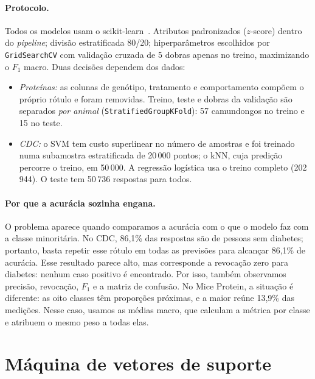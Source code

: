 \documentclass[aps,pre,twocolumn,10pt,nofootinbib]{revtex4-2}
\begin{document}
\paragraph{Protocolo.}
Todos os modelos usam o scikit-learn~\cite{sklearn}.
Atributos padronizados ($z$-score) dentro do \textit{pipeline}; divisão
estratificada 80/20; hiperparâmetros escolhidos por \texttt{GridSearchCV}
com validação cruzada de 5 dobras apenas no treino, maximizando o $F_1$
macro. Duas decisões dependem dos dados:
\begin{itemize}
\item \emph{Proteínas:} as colunas de genótipo, tratamento e comportamento
compõem o próprio rótulo e foram removidas. Treino, teste e dobras da
validação são separados \emph{por animal} (\texttt{StratifiedGroupKFold}):
57 camundongos no treino e 15 no teste.
\item \emph{CDC:} o SVM tem custo superlinear no número de amostras e foi
treinado numa subamostra estratificada de 20\,000 pontos; o kNN, cuja
predição percorre o treino, em 50\,000. A regressão logística usa o treino
completo (202\,944). O teste tem 50\,736 respostas para todos.
\end{itemize}

\paragraph{Por que a acurácia sozinha engana.}
O problema aparece quando comparamos a acurácia com o que o modelo faz com
a classe minoritária. No CDC, 86,1\% das respostas são de pessoas sem
diabetes; portanto, basta repetir esse rótulo em todas as previsões para
alcançar 86,1\% de acurácia. Esse resultado parece alto, mas corresponde a
revocação zero para diabetes: nenhum caso positivo é encontrado. Por isso,
também observamos precisão, revocação, $F_1$ e a matriz de confusão. No
Mice Protein, a situação é diferente: as oito classes têm proporções
próximas, e a maior reúne 13,9\% das medições. Nesse caso, usamos as
médias macro, que calculam a métrica por classe e atribuem o mesmo peso a
todas elas.

\section{Máquina de vetores de suporte}
\end{document}
